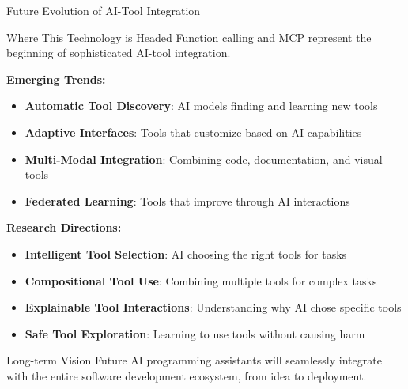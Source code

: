 \documentclass{beamer}
\begin{document}
\begin{frame}[t]{Future Evolution of AI-Tool Integration}
    \begin{block}{Where This Technology is Headed}
        Function calling and MCP represent the beginning of sophisticated AI-tool integration.
    \end{block}
    
    \textbf{Emerging Trends:}
    \begin{itemize}
        \item \textbf{Automatic Tool Discovery}: AI models finding and learning new tools
        \item \textbf{Adaptive Interfaces}: Tools that customize based on AI capabilities
        \item \textbf{Multi-Modal Integration}: Combining code, documentation, and visual tools
        \item \textbf{Federated Learning}: Tools that improve through AI interactions
    \end{itemize}
    
    \textbf{Research Directions:}
    \begin{itemize}
        \item \textbf{Intelligent Tool Selection}: AI choosing the right tools for tasks
        \item \textbf{Compositional Tool Use}: Combining multiple tools for complex tasks
        \item \textbf{Explainable Tool Interactions}: Understanding why AI chose specific tools
        \item \textbf{Safe Tool Exploration}: Learning to use tools without causing harm
    \end{itemize}
    
    \begin{alertblock}{Long-term Vision}
        Future AI programming assistants will seamlessly integrate with the entire software development ecosystem, from idea to deployment.
    \end{alertblock}
\end{frame}
\end{document}
